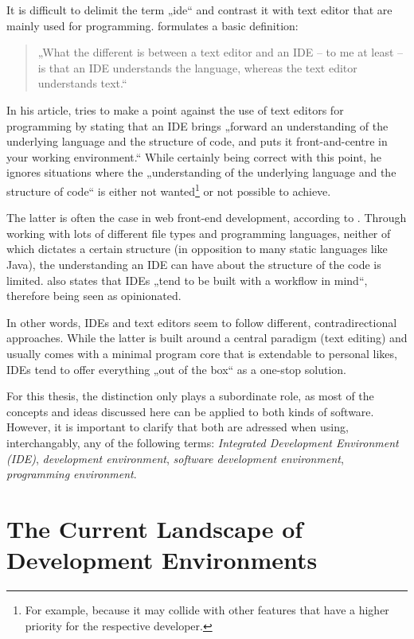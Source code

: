 It is difficult to delimit the term „\acl{ide}“ and contrast it with
text editor that are mainly used for programming. 
formulates a basic definition:

\begin{quote}
„What the different is between a text editor and an IDE – to me at least
– is that an IDE understands the language, whereas the text editor
understands text.“ \citeyear{reynolds}
\end{quote}

In his article,  tries to make a point against the
use of text editors for programming by stating that an IDE brings
„forward an understanding of the underlying language and the structure
of code, and puts it front-and-centre in your working environment.“
\citeyear{reynolds} While certainly being correct with this point, he
ignores situations where the „understanding of the underlying language
and the structure of code“ is either not
wanted\footnote{For example, because it may collide with other features that have a higher priority for the respective developer.}
or not possible to achieve.

The latter is often the case in web front-end development, according to
. Through working with lots of different file types
and programming languages, neither of which dictates a certain structure
(in opposition to many static languages like Java), the understanding an
IDE can have about the structure of the code is limited.
 also states that IDEs „tend to be built with a workflow
in mind“, therefore being seen as opinionated.

In other words, IDEs and text editors seem to follow different,
contradirectional approaches. While the latter is built around a central
paradigm (text editing) and usually comes with a minimal program core
that is extendable to personal likes, IDEs tend to offer everything „out
of the box“ as a one-stop solution.

For this thesis, the distinction only plays a subordinate role, as most
of the concepts and ideas discussed here can be applied to both kinds of
software. However, it is important to clarify that both are adressed
when using, interchangably, any of the following terms: \emph{Integrated
Development Environment (IDE)}, \emph{development environment},
\emph{software development environment}, \emph{programming environment}.

\section{The Current Landscape of Development
Environments}\label{the-current-landscape-of-development-environments}


